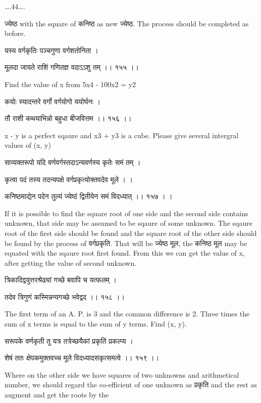 \documentclass[]{article}
\date{}
\begin{document}
{\ldots{}.44\ldots{}.}

{ज्येष्ठ with the square of कनिष्ठ as new ज्येष्ठ. The process should be
completed as before. }

{यस्य वर्गकृतिः पञ्चगुणा वर्गशतोनिता । }

{मूलदा जायते राशिं गणितज्ञ वदाऽऽशु तम् ।। १५५ ।। }

{Find the value of x from 5x}{4}{ - 100x}{2}{ = y}{2}

{कयोः स्यादन्तरे वर्गो वर्गयोगो ययोर्घनः । }

{तौ राशी कथयाभिन्नो बहुधा बीजवित्तम ।। १५६ ।। }

{x - y is a perfect sqaure and x}{3}{ + y}{3}{ is a cube. Please give
several intergral values of (x, y)}

{साव्यक्तरूपो यदि वर्णवर्गस्तदाऽन्यवर्णस्य कृतेः समं तम् । }

{कृत्वा पदं तस्य तदन्यपक्षे वर्गप्रकृत्योक्तवदेव मूले । । }

{कनिष्ठमाद्येन पदेन तुल्यं ज्येष्ठं द्वितीयेन समं विदध्यात् ।। १५७ । । }

{If it is possible to find the square root of one side and the second
side contains unknown, that side may be assumed to be sqaure of some
unknown. The sqaure root of the first side should be found and the
square root of the other side should be found by the process of
वर्गप्रकृति. That will be ज्येष्ठ मूल, the कनिष्ठ मूल may be equated
with the sqaure root first found. From this we can get the value of x,
after getting the value of second unknown.}

{त्रिकादिद्वयुत्तरश्रेढ्यां गच्छे बवापि च यत्फलम् । }

{तदेव त्रिगुणं कस्मिन्नन्यगच्छे भवेद्वद ।। १५८ ।। }

{The first term of an A. P. is 3 and the common difference is 2. Three
times the sum of x terms is equal to the sum of y terms. Find (x, y).}

{सरूपके वर्णकृती तु यत्र तत्रेच्छयैकां प्रकृतिं प्रकल्प्य । }

{शेषं ततः क्षेपकमुक्तवच्च मूले विदध्यादसकृत्समत्वे ।। १५९ ।। }

{Where on the other side we have squares of two unknowns and
arithmetical number, we should regard the co-efficient of one unknown as
प्रकृति and the rest as augment and get the roots by the}
\end{document}
